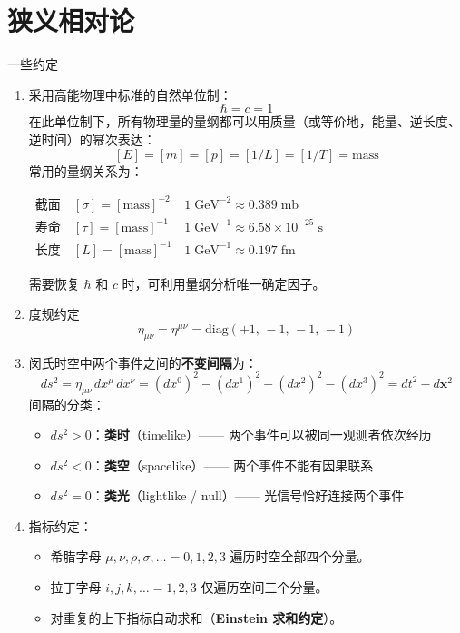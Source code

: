 \section{狭义相对论}
一些约定
\begin{enumerate}
    \item  采用高能物理中标准的自然单位制：
      \begin{equation}\label{eq:natural-units}
        \hbar = c = 1
      \end{equation}
      在此单位制下，所有物理量的量纲都可以用质量（或等价地，能量、逆长度、逆时间）的幂次表达：
      \[
        [E] = [m] = [p] = [1/L] = [1/T] = \text{mass}
      \]
      常用的量纲关系为：
      \begin{center}
      \begin{tabular}{lll}
        截面 & $[\sigma] = [\text{mass}]^{-2}$ & $1\;\text{GeV}^{-2} \approx 0.389\;\text{mb}$ \\
        寿命 & $[\tau] = [\text{mass}]^{-1}$ & $1\;\text{GeV}^{-1} \approx 6.58\times10^{-25}\;\text{s}$ \\
        长度 & $[L] = [\text{mass}]^{-1}$   & $1\;\text{GeV}^{-1} \approx 0.197\;\text{fm}$
      \end{tabular}
      \end{center}
      需要恢复 $\hbar$ 和 $c$ 时，可利用量纲分析唯一确定因子。
    \item  度规约定
      \begin{equation}\label{eq:metric}
        \eta_{\mu\nu} = \eta^{\mu\nu}
        = \mathrm{diag}(+1,\,-1,\,-1,\,-1)
      \end{equation}
    \item 
        闵氏时空中两个事件之间的\textbf{不变间隔}为：
          \begin{equation}\label{eq:interval}
            ds^2 = \eta_{\mu\nu}\,dx^\mu\,dx^\nu
                = (dx^0)^2 - (dx^1)^2 - (dx^2)^2 - (dx^3)^2
                = dt^2 - d\mathbf{x}^2
          \end{equation}
          间隔的分类：
          \begin{itemize}
            \item $ds^2 > 0$：\textbf{类时}（timelike）——
                  两个事件可以被同一观测者依次经历
            \item $ds^2 < 0$：\textbf{类空}（spacelike）——
                  两个事件不能有因果联系
            \item $ds^2 = 0$：\textbf{类光}（lightlike / null）——
                  光信号恰好连接两个事件
          \end{itemize}
    \item 指标约定：
          \begin{itemize}
            \item 希腊字母 $\mu, \nu, \rho, \sigma, \ldots = 0, 1, 2, 3$ 遍历时空全部四个分量。
            \item 拉丁字母 $i, j, k, \ldots = 1, 2, 3$ 仅遍历空间三个分量。
            \item 对重复的上下指标自动求和（\textbf{Einstein 求和约定}）。
          \end{itemize}


\end{enumerate}
